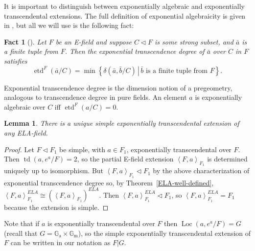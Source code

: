 \documentclass[12pt]{amsart}
\newtheorem{lemma}[prop]{Lemma}
\newtheorem{fact}[prop]{Fact}
\theoremstyle{definition}
\begin{document}
It is important to distinguish between exponentially algebraic and exponentially transcendental extensions. The full definition of exponential algebraicity is given in \cite{EAEF}, but all we will use is the following fact:
\begin{fact}[{\cite[Theorem~1.3]{EAEF}}]\label{etd fact}
  Let $F$ be an E-field and suppose $C {\ensuremath{\lhd}} F$ is some strong subset, and ${{\ensuremath{\bar{a}}}}$ is a finite tuple from $F$. Then the exponential transcendence degree of ${{\ensuremath{\bar{a}}}}$ over $C$ in $F$ satisfies \[\operatorname{etd}^F({{\ensuremath{\bar{a}}}}/C) = \min{\ensuremath{\left\{ {\delta({{\ensuremath{\bar{a}}}},{{\ensuremath{\bar{b}}}}/C)} \,\left|\, {{{\ensuremath{\bar{b}}}} \mbox{ is a finite tuple from } F} \right.\right\}}}.\]
\end{fact}
Exponential transcendence degree is the dimension notion of a pregeometry, analogous to transcendence degree in pure fields. An element $a$ is exponentially algebraic over $C$ iff $\operatorname{etd}^F(a/C) = 0$.

\begin{lemma}\label{unique generic extensions}
  There is a unique simple exponentially transcendental extension of any ELA-field.
\end{lemma}
\begin{proof}
  Let $F {\ensuremath{\lhd}} F_1$ be simple, with $a \in F_1$, exponentially transcendental over $F$. Then $\operatorname{td}(a,e^a/F) = 2$, so the partial E-field extension ${\ensuremath{\left\langle {F,a} \right\rangle}}_{F_1}$ is determined uniquely up to isomorphism. But ${\ensuremath{\left\langle {F,a} \right\rangle}}_{F_1} {\ensuremath{\lhd}} F_1$ by the above characterization of exponential transcendence degree so, by Theorem~\ref{ELA-well-defined}, ${\ensuremath{\left\langle {F,a} \right\rangle}}^{ELA}_{F_1} {\cong} ({\ensuremath{\left\langle {F,a} \right\rangle}}_{F_1})^{ELA}$. Then ${\ensuremath{\left\langle {F,a} \right\rangle}}^{ELA}_{F_1} {\ensuremath{\lhd}} F_1$, so ${\ensuremath{\left\langle {F,a} \right\rangle}}^{ELA}_{F_1} = F_1$ because the extension is simple.
\end{proof}
Note that if $a$ is exponentially transcendental over $F$ then
$\operatorname{Loc}(a,e^a/F) = G$ (recall that $G ={\ensuremath{\mathbb{G}_\mathrm{a}}}{\ensuremath{\times}} {\ensuremath{\mathbb{G}_\mathrm{m}}}$), so the simple exponentially transcendental extension of $F$ can be written in our notation as $F|G$.
\end{document}
